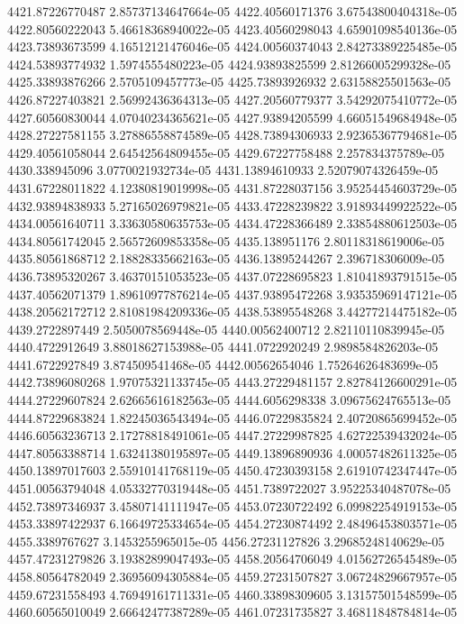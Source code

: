 {4421.87226770487 2.85737134647664e-05
4422.40560171376 3.67543800404318e-05
4422.80560222043 5.46618368940022e-05
4423.40560298043 4.65901098540136e-05
4423.73893673599 4.16512121476046e-05
4424.00560374043 2.84273389225485e-05
4424.53893774932 1.5974555480223e-05
4424.93893825599 2.81266005299328e-05
4425.33893876266 2.5705109457773e-05
4425.73893926932 2.63158825501563e-05
4426.87227403821 2.56992436364313e-05
4427.20560779377 3.54292075410772e-05
4427.60560830044 4.07040234365621e-05
4427.93894205599 4.66051549684948e-05
4428.27227581155 3.27886558874589e-05
4428.73894306933 2.92365367794681e-05
4429.40561058044 2.64542564809455e-05
4429.67227758488 2.257834375789e-05
4430.338945096 3.0770021932734e-05
4431.13894610933 2.52079074326459e-05
4431.67228011822 4.12380819019998e-05
4431.87228037156 3.95254454603729e-05
4432.93894838933 5.27165026979821e-05
4433.47228239822 3.91893449922522e-05
4434.00561640711 3.33630580635753e-05
4434.47228366489 2.33854880612503e-05
4434.80561742045 2.56572609853358e-05
4435.138951176 2.80118318619006e-05
4435.80561868712 2.18828335662163e-05
4436.13895244267 2.396718306009e-05
4436.73895320267 3.46370151053523e-05
4437.07228695823 1.81041893791515e-05
4437.40562071379 1.89610977876214e-05
4437.93895472268 3.93535969147121e-05
4438.20562172712 2.81081984209336e-05
4438.53895548268 3.44277214475182e-05
4439.2722897449 2.5050078569448e-05
4440.00562400712 2.82110110839945e-05
4440.4722912649 3.88018627153988e-05
4441.0722920249 2.9898584826203e-05
4441.6722927849 3.874509541468e-05
4442.00562654046 1.75264626483699e-05
4442.73896080268 1.97075321133745e-05
4443.27229481157 2.82784126600291e-05
4444.27229607824 2.62665616182563e-05
4444.6056298338 3.09675624765513e-05
4444.87229683824 1.82245036543494e-05
4446.07229835824 2.40720865699452e-05
4446.60563236713 2.17278818491061e-05
4447.27229987825 4.62722539432024e-05
4447.80563388714 1.63241380195897e-05
4449.13896890936 4.00057482611325e-05
4450.13897017603 2.55910141768119e-05
4450.47230393158 2.61910742347447e-05
4451.00563794048 4.05332770319448e-05
4451.7389722027 3.95225340487078e-05
4452.73897346937 3.45807141111947e-05
4453.07230722492 6.09982254919153e-05
4453.33897422937 6.16649725334654e-05
4454.27230874492 2.48496453803571e-05
4455.3389767627 3.1453255965015e-05
4456.27231127826 3.29685248140629e-05
4457.47231279826 3.19382899047493e-05
4458.20564706049 4.01562726545489e-05
4458.80564782049 2.36956094305884e-05
4459.27231507827 3.06724829667957e-05
4459.67231558493 4.76949161711331e-05
4460.33898309605 3.13157501548599e-05
4460.60565010049 2.66642477387289e-05
4461.07231735827 3.46811848784814e-05
}
